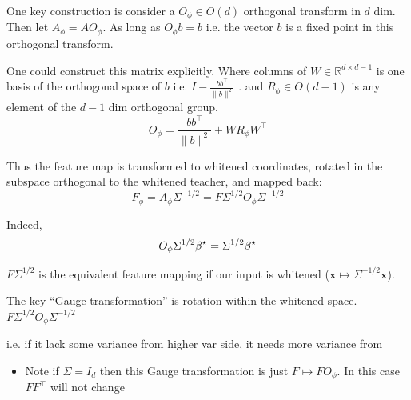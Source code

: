\begin{example}
 One key construction is consider a $O_{\phi}\in O(d)$ orthogonal
transform in $d$ dim. Then let $A_{\phi}=AO_{\phi}$. As long as
$O_{\phi}b=b$ i.e. the vector $b$ is a fixed point in this orthogonal
transform.

One could construct this matrix explicitly. Where columns of $W\in\mathbb{R}^{d\times d-1}$
is one basis of the orthogonal space of $b$ i.e. $I-\frac{bb^{\top}}{\|b\|^{2}}$
. and $R_{\phi}\in O(d-1)$ is any element of the $d-1$ dim orthogonal
group.
\[
O_{\phi}=\frac{bb^{\top}}{\|b\|^{2}}+WR_{\phi}W^{\top}
\]

Thus the feature map is transformed to whitened coordinates, rotated in the
subspace orthogonal to the whitened teacher, and mapped back:
\[
F_{\phi}=A_{\phi}\Sigma^{-1/2}=F\Sigma^{1/2}O_{\phi}\Sigma^{-1/2}
\]

Indeed,
\[
O_{\phi}\Sigma^{1/2}{\beta^{\star}}=\Sigma^{1/2}{\beta^{\star}}
\]

$F\Sigma^{1/2}$ is the equivalent feature mapping if our input is
whitened ($\mathbf{x}\mapsto\Sigma^{-1/2}\mathbf{x}$).
\end{example}
The key ``Gauge transformation'' is rotation within the whitened
space. $F\Sigma^{1/2}O_{\phi}\Sigma^{-1/2}$

i.e. if it lack some variance from higher var side, it needs more
variance from
\begin{itemize}
\item Note if $\Sigma=I_{d}$ then this Gauge transformation is just $F\mapsto FO_{\phi}$.
In this case $FF^{\top}$ will not change
\end{itemize}

